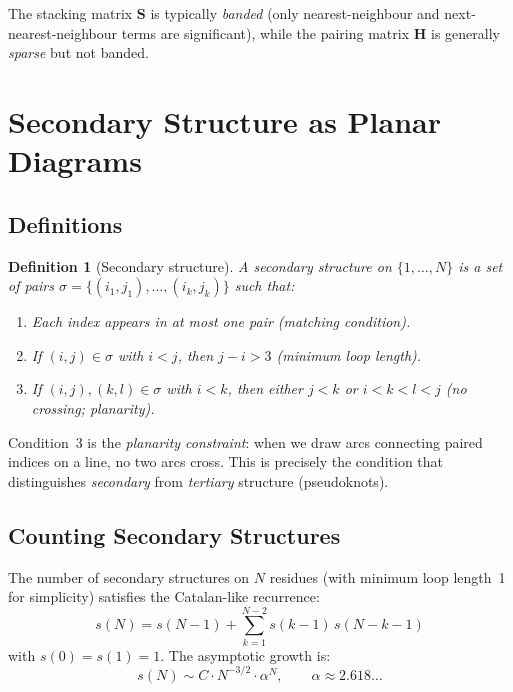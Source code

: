 \documentclass[11pt]{article}
\newtheorem{definition}{Definition}[section]
\begin{document}
The stacking matrix $\mathbf{S}$ is typically \emph{banded} (only
nearest-neighbour and next-nearest-neighbour terms are significant),
while the pairing matrix $\mathbf{H}$ is generally \emph{sparse} but
not banded.

\section{Secondary Structure as Planar Diagrams}

\subsection{Definitions}

\begin{definition}[Secondary structure]
A \emph{secondary structure} on $\{1, \ldots, N\}$ is a set of pairs
$\sigma = \{(i_1, j_1), \ldots, (i_k, j_k)\}$ such that:
\begin{enumerate}
  \item Each index appears in at most one pair (matching condition).
  \item If $(i, j) \in \sigma$ with $i < j$, then $j - i > 3$
        (minimum loop length).
  \item If $(i, j), (k, l) \in \sigma$ with $i < k$, then either
        $j < k$ or $i < k < l < j$ (no crossing; planarity).
\end{enumerate}
\end{definition}

Condition~3 is the \emph{planarity constraint}: when we draw arcs
connecting paired indices on a line, no two arcs cross.  This is
precisely the condition that distinguishes \emph{secondary} from
\emph{tertiary} structure (pseudoknots).

\subsection{Counting Secondary Structures}

The number of secondary structures on $N$ residues (with minimum loop
length~1 for simplicity) satisfies the Catalan-like recurrence:
\begin{equation}
  s(N) = s(N-1) + \sum_{k=1}^{N-2} s(k-1)\, s(N-k-1)
\end{equation}
with $s(0) = s(1) = 1$.  The asymptotic growth is:
\begin{equation}
  s(N) \sim C \cdot N^{-3/2} \cdot \alpha^{N},
  \qquad \alpha \approx 2.618\ldots
\end{equation}
\end{document}
